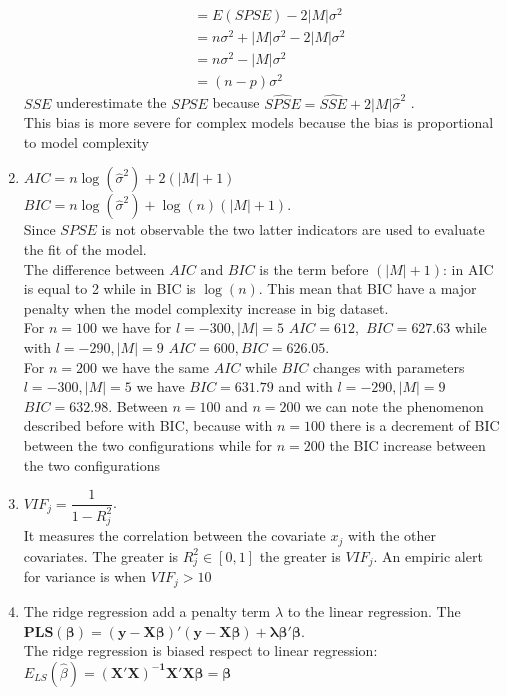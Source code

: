\documentclass[10pt,a4paper]{article}
\begin{document}
\begin{enumerate}
\begin{align*}
			&= E(SPSE) - 2  |M|\sigma^2 \\
			&= n \sigma^2 + |M|\sigma^2 -2 |M|\sigma^2 \\
			&= n \sigma^2 - |M|\sigma^2 \\
			&= (n-p)\sigma^2
			\end{align*} 
			$ SSE $  underestimate the $ SPSE $ because $ \hat{SPSE} = \hat{SSE} + 2  |M| \hat{\sigma}^2$ .\\
			This bias is more severe for complex models because the bias is proportional to model complexity
			\item $ AIC =n \log(\hat{\sigma}^2) + 2 (|M| + 1) $\\
			$ BIC = n \log(\hat{\sigma}^2) + \log(n) (|M| + 1) $.\\
			Since $ SPSE  $ is not observable the two latter indicators are used to evaluate the fit of the model.\\
			The difference between $ AIC \text{ and } BIC $ is the term before $ (|M| + 1) $: in AIC is equal to 2 while in BIC is $ \log(n) $. This mean that BIC have a major penalty when the model complexity increase in big dataset.\\
			For $ n = 100 $ we have for $ l = -300, |M| = 5 $ $ AIC = 612, \,\, BIC = 627.63 $ while with $ l = -290, |M| = 9 $ $ AIC = 600, BIC = 626.05 $.\\
			For $ n = 200 $ we have the same $ AIC $ while $ BIC $ changes with parameters $ l = -300, |M| = 5 $  we have $ BIC = 631.79 $ and with  $ l = -290, |M| = 9 $ $ BIC = 632.98 $.
			Between $ n = 100 $ and $ n = 200 $ we can note the phenomenon described before with BIC, because with $ n = 100 $ there is a decrement of BIC between the two configurations while for $ n = 200 $ the BIC increase between the two configurations
			\item $ VIF_j = \dfrac{1}{1 - R_j^2} $.\\It measures the correlation between the covariate $ x_j $ with the other covariates. The greater is $ R^2_j \in [0,1]$ the greater is $ VIF_j $. An empiric alert for variance is when $ VIF_j > 10 $
			\item The ridge regression add a penalty term $ \lambda $ to the linear regression. The $ \mathbf{PLS(\beta) = (y - X \beta)'(y - X \beta) + \lambda \beta' \beta} $.\\The ridge regression is biased respect to linear regression:\\
			$ E_{LS}(\hat{\beta}) = \mathbf{(X'X)^{-1} X'X \beta = \beta} $\\

\end{enumerate}
\end{document}
